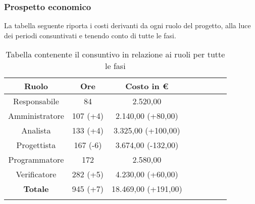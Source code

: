 \subsubsection{Prospetto economico}

La tabella seguente riporta i costi derivanti da ogni ruolo del progetto, alla luce dei periodi consuntivati e tenendo conto di tutte le fasi.

\begin{longtable}{|c|c|c|c|c|c|c|c|}
	\hline
	\rowcolor{lighter-grayer}
	\textbf{Ruolo}  & \textbf{Ore} & \textbf{Costo in €} \\
	\hline
	\endfirsthead

	\hline
	Responsabile    & 84           & 2.520,00            \\
	\hline
	\hline
	Amministratore  & 107 (+4)          & 2.140,00 (+80,00)           \\
	\hline
	\hline
	Analista        & 133 (+4)         & 3.325,00 (+100,00)           \\
	\hline
	\hline
	Progettista     & 167 (-6)         & 3.674,00 (-132,00)           \\
	\hline
	\hline
	Programmatore   & 172          & 2.580,00            \\
	\hline
	\hline
	Verificatore    & 282 (+5)         & 4.230,00 (+60,00)           \\
	\hline
	\hline
	\textbf{Totale} & 945 (+7)         & 18.469,00 (+191,00)          \\
	\hline
	\rowcolor{white}
	\caption{Tabella contenente il consuntivo in relazione ai ruoli per tutte le fasi}
\end{longtable}



